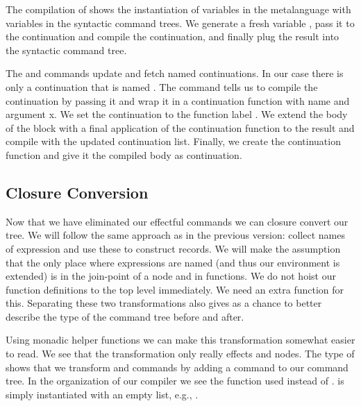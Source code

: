 The compilation of  shows the instantiation of variables in the metalanguage with variables in the syntactic command trees. We generate a fresh variable , pass it to the continuation and compile the continuation, and finally plug the result into the syntactic command tree.

The  and  commands update and fetch named continuations. In our case there is only a continuation that is named . The  command tells us to compile the continuation  by passing it  and wrap it in a continuation function with name  and argument {x}. We set the continuation  to the function label . We extend the body of the block with a final application of the continuation function  to the result  and compile with the updated continuation list. Finally, we create the continuation function and give it the compiled body  as continuation.

\subsection{\label{subsection:closconvert2}Closure Conversion}
Now that we have eliminated our effectful commands we can closure convert our tree. We will follow the same approach as in the previous version: collect names of expression and use these to construct records. We will make the assumption that the only place where expressions are named (and thus our environment is extended) is in the join-point of a node and in functions. We do not hoist our function definitions to the top level immediately. We need an extra function for this. Separating these two transformations also gives as a chance to better describe the type of the command tree before and after.

Using monadic helper functions we can make this transformation somewhat easier to read. We see that the transformation only really effects  and  nodes. The type of  shows that we transform  and  commands by adding a  command to our command tree. In the organization of our compiler we see the function  used instead of .  is simply  instantiated with an empty list, e.g., .

\begin{lstlisting}[language=Haskell]
\end{lstlisting}


